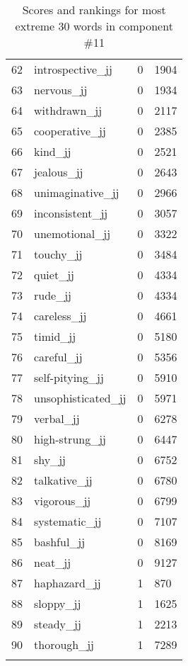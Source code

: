\begin{longtable}[!htbp]{| rlr@{.}l |}
    62 & introspective\_jj & 0 & 1904 \\
    63 & nervous\_jj & 0 & 1934 \\
    64 & withdrawn\_jj & 0 & 2117 \\
    65 & cooperative\_jj & 0 & 2385 \\
    66 & kind\_jj & 0 & 2521 \\
    67 & jealous\_jj & 0 & 2643 \\
    68 & unimaginative\_jj & 0 & 2966 \\
    69 & inconsistent\_jj & 0 & 3057 \\
    70 & unemotional\_jj & 0 & 3322 \\
    71 & touchy\_jj & 0 & 3484 \\
    72 & quiet\_jj & 0 & 4334 \\
    73 & rude\_jj & 0 & 4334 \\
    74 & careless\_jj & 0 & 4661 \\
    75 & timid\_jj & 0 & 5180 \\
    76 & careful\_jj & 0 & 5356 \\
    77 & self-pitying\_jj & 0 & 5910 \\
    78 & unsophisticated\_jj & 0 & 5971 \\
    79 & verbal\_jj & 0 & 6278 \\
    80 & high-strung\_jj & 0 & 6447 \\
    81 & shy\_jj & 0 & 6752 \\
    82 & talkative\_jj & 0 & 6780 \\
    83 & vigorous\_jj & 0 & 6799 \\
    84 & systematic\_jj & 0 & 7107 \\
    85 & bashful\_jj & 0 & 8169 \\
    86 & neat\_jj & 0 & 9127 \\
    87 & haphazard\_jj & 1 & 870 \\
    88 & sloppy\_jj & 1 & 1625 \\
    89 & steady\_jj & 1 & 2213 \\
    90 & thorough\_jj & 1 & 7289 \\
    \hline
    \caption{Scores and rankings for most extreme 30 words in component \#11} \\
\end{longtable}
